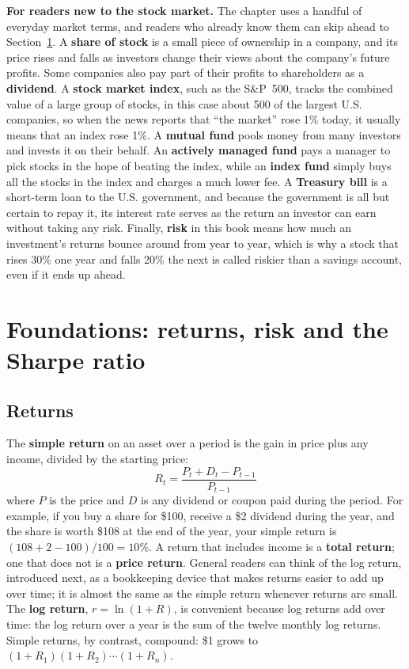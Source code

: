 \begin{callout}
\textbf{For readers new to the stock market.} The chapter uses a handful of everyday market terms, and readers who already know them can skip ahead to Section~\ref{sec:01-foundations}. A \textbf{share of stock} is a small piece of ownership in a company, and its price rises and falls as investors change their views about the company's future profits. Some companies also pay part of their profits to shareholders as a \textbf{dividend}. A \textbf{stock market index}, such as the S\&P~500, tracks the combined value of a large group of stocks, in this case about 500 of the largest U.S. companies, so when the news reports that ``the market'' rose 1\% today, it usually means that an index rose 1\%. A \textbf{mutual fund} pools money from many investors and invests it on their behalf. An \textbf{actively managed fund} pays a manager to pick stocks in the hope of beating the index, while an \textbf{index fund} simply buys all the stocks in the index and charges a much lower fee. A \textbf{Treasury bill} is a short-term loan to the U.S. government, and because the government is all but certain to repay it, its interest rate serves as the return an investor can earn without taking any risk. Finally, \textbf{risk} in this book means how much an investment's returns bounce around from year to year, which is why a stock that rises 30\% one year and falls 20\% the next is called riskier than a savings account, even if it ends up ahead.
\end{callout}



\section{Foundations: returns, risk and the Sharpe ratio}
\label{sec:01-foundations}

\subsection{Returns}

The \textbf{simple return} on an asset over a period is the gain in price plus any income, divided by the starting price:
\begin{equation}
  R_t = \frac{P_t + D_t - P_{t-1}}{P_{t-1}}
  \label{eq:01-return}
\end{equation}
where $P$ is the price and $D$ is any dividend or coupon paid during the period. For example, if you buy a share for \$100, receive a \$2 dividend during the year, and the share is worth \$108 at the end of the year, your simple return is $(108 + 2 - 100)/100 = 10$\%. A return that includes income is a \textbf{total return}; one that does not is a \textbf{price return}. General readers can think of the log return, introduced next, as a bookkeeping device that makes returns easier to add up over time; it is almost the same as the simple return whenever returns are small. The \textbf{log return}, $r = \ln(1 + R)$, is convenient because log returns add over time: the log return over a year is the sum of the twelve monthly log returns. Simple returns, by contrast, compound: \$1 grows to $(1 + R_1)(1 + R_2)\cdots(1 + R_n)$.

